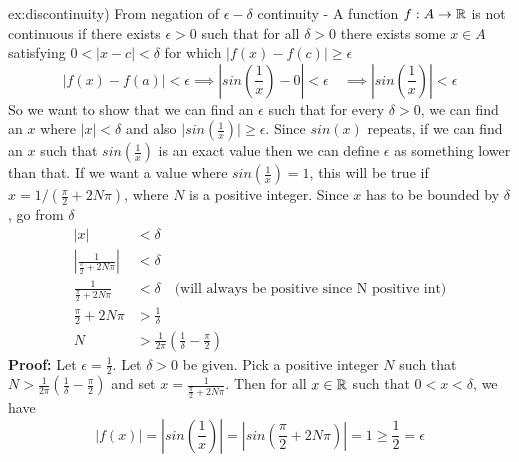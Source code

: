 \documentclass[landscape, 8pt]{extarticle}
\begin{document}
\begin{multicols}{3}
\begin{xmp}{ex:discontinuity}{)}
    From negation of $\epsilon-\delta$ continuity - A function $f:A\to\mathbb{R}$ is not continuous if there exists $\epsilon>0$ such that for all $\delta>0$ there exists some $x \in A$ satisfying $0<\lvert x-c \rvert<\delta$ for which $\lvert  f(x)-f(c) \rvert\ge \epsilon$
    \[\lvert f(x) - f(a)\rvert < \epsilon \implies \left\lvert sin\left(\frac{1}{x}\right) - 0 \right\rvert < \epsilon \quad \implies \left\lvert sin\left(\frac{1}{x}\right)\right\rvert < \epsilon\]
    So we want to show that we can find an $\epsilon$ such that for every $\delta > 0$, we can find an $x$ where $\lvert x\rvert < \delta$ and also $\lvert sin(\frac{1}{x})\rvert \ge \epsilon$.
    \vspace{0pt}\newline
    Since $sin(x)$ repeats, if we can find an $x$ such that $sin(\frac{1}{x})$ is an exact value then we can define $\epsilon$ as something lower than that. If we want a value where $sin(\frac{1}{x}) = 1$, this will be true if $x = 1 / (\frac{\pi}{2} + 2N\pi)$, where $N$ is a positive integer.
    \vspace{0pt}\newline
    Since $x$ has to be bounded by $\delta$, go from $\delta$
    \[\begin{aligned}
        \lvert x\rvert  &< \delta\\
        \left\lvert \frac{1}{\frac{\pi}{2}+2N\pi}\right\rvert &< \delta\\
        \frac{1}{\frac{\pi}{2}+2N\pi} &< \delta \quad \text{(will always be positive since N positive int)}\\ 
        \frac{\pi}{2}+2N\pi &> \frac{1}{\delta}\\
        N &> \frac{1}{2\pi}\left( \frac{1}{\delta} - \frac{\pi}{2} \right)
    \end{aligned}\]
    \textbf{Proof:} Let $\epsilon = \frac{1}{2}$. Let $\delta > 0$ be given. Pick a positive integer $N$ such that $N > \frac{1}{2\pi}\left( \frac{1}{\delta} - \frac{\pi}{2} \right)$ and set $x = \frac{1}{\frac{\pi}{2} + 2N\pi}$. Then for all $x\in \mathbb{R}$ such that $0 < x < \delta$, we have
    \[\lvert f(x)\rvert = \left\lvert sin\left(\frac{1}{x}\right) \right\rvert = \left\lvert sin\left(\frac{\pi}{2} + 2N\pi\right) \right\rvert = 1 \ge \frac{1}{2} = \epsilon\]
\end{xmp}
\vspace{-5pt}


\lipsum[1-12]

\end{multicols}
\end{document}
